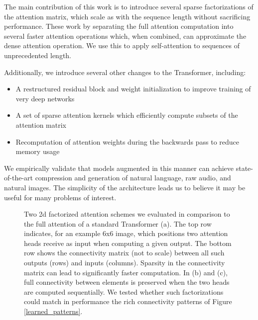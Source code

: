 \documentclass{article}
\begin{document}
The main contribution of this work is to introduce several sparse factorizations of the attention matrix, which scale as  with the sequence length without sacrificing performance. These work by separating the full attention computation into several faster attention operations which, when combined, can approximate the dense attention operation. We use this to apply self-attention to sequences of unprecedented length.

Additionally, we introduce several other changes to the Transformer, including:

\begin{itemize}
  \item A restructured residual block and weight initialization to improve training of very deep networks
  \item A set of sparse attention kernels which efficiently compute subsets of the attention matrix
  \item Recomputation of attention weights during the backwards pass to reduce memory usage
\end{itemize}

We empirically validate that models augmented in this manner can achieve state-of-the-art compression and generation of natural language, raw audio, and natural images. The simplicity of the architecture leads us to believe it may be useful for many problems of interest.

\begin{figure*}
\centering     {} \qquad \qquad
{} \qquad \qquad
{}
\caption{Two 2d factorized attention schemes we evaluated in comparison to the full attention of a standard Transformer (a). The top row indicates, for an example 6x6 image, which positions two attention heads receive as input when computing a given output. The bottom row shows the connectivity matrix (not to scale) between all such outputs (rows) and inputs (columns). Sparsity in the connectivity matrix can lead to significantly faster computation. In (b) and (c), full connectivity between elements is preserved when the two heads are computed sequentially. We tested whether such factorizations could match in performance the rich connectivity patterns of Figure \ref{learned_patterns}. }
\end{figure*}
\end{document}
